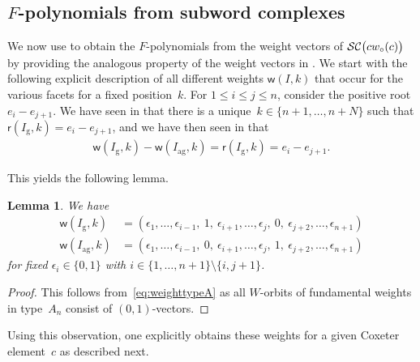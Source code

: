 \documentclass[10pt]{amsart}
\newtheorem{lemm}[theo]{Lemma}\newtheorem{prop}[theo]{Proposition}\newtheorem{coro}[theo]{Corollary}\newtheorem{conj}[theo]{Conjecture}
\theoremstyle{definition}\newtheorem{rema}[theo]{Remark}\newtheorem{exem}[theo]{Example}
\newcommand{\subwordComplex}{\mathcal{SC}}
\newcommand{\clusterComplex}{\subwordComplex\big(\cw{c}\big)}
\newcommand{\greedy}{I_{\operatorname{g}}}
\newcommand{\antigreedy}{I_{\operatorname{ag}}}
\newcommand{\sq}[1]{{\rm #1}}
\newcommand{\sfr}{\mathsf{r}}
\newcommand{\sfw}{\mathsf{w}}
\newcommand{\wo}{{w_\circ}}
\newcommand{\sw}[2]{\sq{#1}(\sq{#2})}
\newcommand{\cwo}[1]{\sw{\wo}{#1}}
\newcommand{\cw}[1]{\sq{#1}\cwo{#1}}
\newcommand{\Root}[2]{{\sfr}(#1,#2)}
\newcommand{\Weight}[2]{{\sfw}(#1,#2)}
\begin{document}
\subsection{\texorpdfstring{$F$}{F}-polynomials from subword complexes}

We now use  to obtain the $F$-polynomials from the weight vectors of $\clusterComplex$ by providing the analogous property of the weight vectors in . We start with the following explicit description of all different weights $\Weight{I}{k}$ that occur for the various facets for a fixed position~$k$. For $1 \leq i \leq j \leq n$, consider the positive root $e_i - e_{j+1}$. We have seen in  that there is a unique~$k \in \{n+1,\dots,n+N\}$ such that $\Root{\greedy}{k} = e_i - e_{j+1}$, and we have then seen in  that
\begin{align}
\Weight{\greedy}{k} - \Weight{\antigreedy}{k} = \Root{\greedy}{k} = e_i - e_{j+1}. \label{eq:weighttypeA}
\end{align}

This yields the following lemma.

\begin{lemm}\label{lem:greedyantigreedyweight}
We have
\begin{align}
\Weight{\greedy}{k} &= (\epsilon_1,\dots,\epsilon_{i-1},\ 1,\ \epsilon_{i+1},\dots,\epsilon_{j},\ 0,\ \epsilon_{j+2},\dots,\epsilon_{n+1}) \label{eq:greedyAn}
\\
\Weight{\antigreedy}{k} &= (\epsilon_1,\dots,\epsilon_{i-1},\ 0,\ \epsilon_{i+1},\dots,\epsilon_{j},\ 1,\ \epsilon_{j+2},\dots,\epsilon_{n+1}) \label{eq:antigreedyAn}
\end{align}
for fixed $\epsilon_i \in \{0,1\}$ with $i \in \{1,\dots,n+1\}\setminus\{i,j+1\}$.
\end{lemm}

\begin{proof}
This follows from~\eqref{eq:weighttypeA} as all $W$-orbits of fundamental weights in type~$A_n$ consist of $(0,1)$-vectors.
\end{proof}

Using this observation, one explicitly obtains these weights for a given Coxeter element~$c$ as described next.
\end{document}
